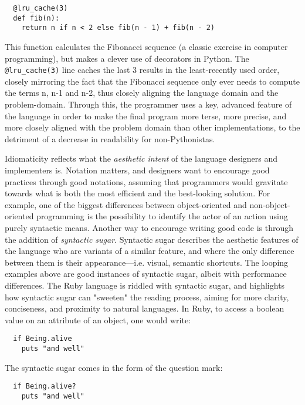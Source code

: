 \documentclass{article}
\begin{document}
\begin{lstlisting}
  @lru_cache(3)
  def fib(n):
    return n if n < 2 else fib(n - 1) + fib(n - 2)
\end{lstlisting}

This function calculates the Fibonacci sequence (a classic exercise in computer programming), but makes a clever use of decorators in Python. The \lstinline{@lru_cache(3)} line caches the last 3 results in the least-recently used order, closely mirroring the fact that the Fibonacci sequence only ever needs to compute the terms n, n-1 and n-2, thus closely aligning the language domain and the problem-domain. Through this, the programmer uses a key, advanced feature of the language in order to make the final program more terse, more precise, and more closely aligned with the problem domain than other implementations, to the detriment of a decrease in readability for non-Pythonistas.

Idiomaticity reflects what the \emph{aesthetic intent} of the language designers and implementers is. Notation matters, and designers want to encourage good practices through good notations, assuming that programmers would gravitate towards what is both the most efficient and the best-looking solution. For example, one of the biggest differences between object-oriented and non-object-oriented programming is the possibility to identify the actor of an action using purely syntactic means\cite{sustrik_250bpm_2021}. Another way to encourage writing good code is through the addition of \emph{syntactic sugar}. Syntactic sugar describes the aesthetic features of the language who are variants of a similar feature, and where the only difference between them is their appearance—i.e. visual, semantic shortcuts. The looping examples above are good instances of syntactic sugar, albeit with performance differences. The Ruby language is riddled with syntactic sugar, and highlights how syntactic sugar can "sweeten" the reading process, aiming for more clarity, conciseness, and proximity to natural languages. In Ruby, to access a boolean value on an attribute of an object, one would write:

\begin{lstlisting}
  if Being.alive
    puts "and well"
\end{lstlisting}

The syntactic sugar comes in the form of the question mark:

\begin{lstlisting}
  if Being.alive?
    puts "and well"
\end{lstlisting}
\end{document}
